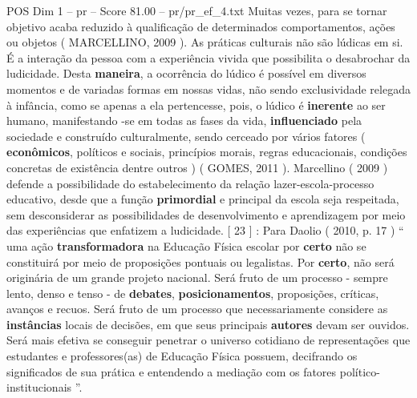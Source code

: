 \begin{textsample}{POS Dim 1 – pr – Score 81.00 – pr/pr\_ef\_4.txt}
Muitas vezes, para se tornar objetivo acaba reduzido à qualificação de determinados comportamentos, ações ou objetos ( MARCELLINO, 2009 ).
As práticas culturais não são lúdicas em si.
É a interação da pessoa com a experiência vivida que possibilita o desabrochar da ludicidade.
Desta \textbf{maneira}, a ocorrência do lúdico é possível em diversos momentos e de variadas formas em nossas vidas, não sendo exclusividade relegada à infância, como se apenas a ela pertencesse, pois, o lúdico é \textbf{inerente} ao ser humano, manifestando -se em todas as fases da vida, \textbf{influenciado} pela sociedade e construído culturalmente, sendo cerceado por vários fatores ( \textbf{econômicos}, políticos e sociais, princípios morais, regras educacionais, condições concretas de existência dentre outros ) ( GOMES, 2011 ).
Marcellino ( 2009 ) defende a possibilidade do estabelecimento da relação lazer-escola-processo educativo, desde que a função \textbf{primordial} e principal da escola seja respeitada, sem desconsiderar as possibilidades de desenvolvimento e aprendizagem por meio das experiências que enfatizem a ludicidade. [ 23 ] : Para Daolio ( 2010, p. 17 ) “ uma ação \textbf{transformadora} na Educação Física escolar por \textbf{certo} não se constituirá por meio de proposições pontuais ou legalistas.
Por \textbf{certo}, não será originária de um grande projeto nacional.
Será fruto de um processo - sempre lento, denso e tenso - de \textbf{debates}, \textbf{posicionamentos}, proposições, críticas, avanços e recuos.
Será fruto de um processo que necessariamente considere as \textbf{instâncias} locais de decisões, em que seus principais \textbf{autores} devam ser ouvidos.
Será mais efetiva se conseguir penetrar o universo cotidiano de representações que estudantes e professores(as) de Educação Física possuem, decifrando os significados de sua prática e entendendo a mediação com os fatores político-institucionais ”.

\end{textsample}
